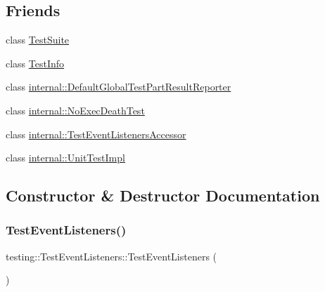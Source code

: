 \subsection*{Friends}
\begin{DoxyCompactItemize}
\item 
class \hyperlink{classtesting_1_1TestEventListeners_ab9aaba231fd11196425e75caf709bfc6}{Test\+Suite}
\item 
class \hyperlink{classtesting_1_1TestEventListeners_a4c49c2cdb6c328e6b709b4542f23de3c}{Test\+Info}
\item 
class \hyperlink{classtesting_1_1TestEventListeners_abae39633da9932847b41cb80efd62115}{internal\+::\+Default\+Global\+Test\+Part\+Result\+Reporter}
\item 
class \hyperlink{classtesting_1_1TestEventListeners_afddba49fdf3f493532b4d5efb9814f4e}{internal\+::\+No\+Exec\+Death\+Test}
\item 
class \hyperlink{classtesting_1_1TestEventListeners_addbc107b6b445617c880182bd4f44cf9}{internal\+::\+Test\+Event\+Listeners\+Accessor}
\item 
class \hyperlink{classtesting_1_1TestEventListeners_acc0a5e7573fd6ae7ad1878613bb86853}{internal\+::\+Unit\+Test\+Impl}
\end{DoxyCompactItemize}


\subsection{Constructor \& Destructor Documentation}
\mbox{\label{classtesting_1_1TestEventListeners_af0716e4067a6f357ee5ea18802a591dd}} 
\subsubsection{\texorpdfstring{Test\+Event\+Listeners()}{TestEventListeners()}}
{\footnotesize\ttfamily testing\+::\+Test\+Event\+Listeners\+::\+Test\+Event\+Listeners (\begin{DoxyParamCaption}{ }\end{DoxyParamCaption})}

\mbox{\label{classtesting_1_1TestEventListeners_abe9fbbbedf7f55fa898abfae60aa4913}} 
